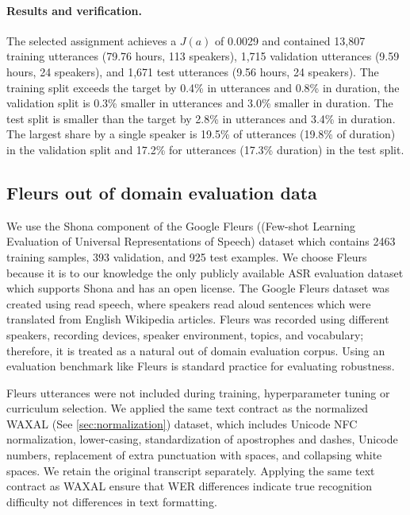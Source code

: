 {\paragraph{Results and verification.}
  The selected assignment achieves a $J(a)$ of 0.0029 and contained 13,807 training utterances  (79.76 hours, 113 speakers), 1,715 validation utterances (9.59 hours, 24 speakers), and 1,671 test utterances (9.56 hours, 24 speakers). The training split exceeds the target by 0.4\% in utterances and 0.8\% in duration, the validation split is 0.3\% smaller in utterances and 3.0\% smaller in duration. The test split is smaller than the target by 2.8\% in utterances and 3.4\% in duration. The largest share by a single speaker is 19.5\% of utterances (19.8\% of duration) in the validation split and 17.2\% for utterances (17.3\% duration) in  the test split. 


\subsection{Fleurs out of domain evaluation data}

We use the Shona component of the Google Fleurs ((Few-shot Learning Evaluation of Universal
Representations of Speech)\citep{Conneau2022} dataset which contains 2463 training samples, 393 validation, and 925 test examples. We choose Fleurs because it is to our knowledge the only publicly available ASR evaluation dataset which supports Shona and has an open license.  The Google Fleurs dataset was created using read speech, where speakers read aloud sentences which were translated from English Wikipedia articles. Fleurs was recorded using different speakers, recording devices, speaker environment, topics, and vocabulary; therefore, it is treated as a natural out of domain evaluation corpus. Using an evaluation benchmark like Fleurs is standard practice for evaluating robustness\citep{Likhomanenko2021}.

Fleurs utterances were not included during training, hyperparameter tuning or curriculum selection. We applied the same text contract as the normalized WAXAL (See \ref{sec:normalization}) dataset, which includes Unicode NFC normalization, lower-casing, standardization of apostrophes and dashes, Unicode numbers, replacement of extra punctuation with spaces, and collapsing white spaces. We retain the original transcript separately. Applying the same text contract as WAXAL ensure that WER differences indicate true recognition difficulty not differences in text formatting. 


}
